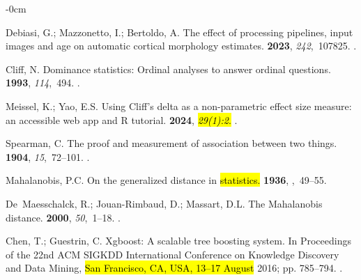 \documentclass[diagnostics,article,accept,pdftex,moreauthors]{Definitions/mdpi}
\begin{document}
\begin{adjustwidth}{-\extralength}{0cm}
\begin{thebibliography}{999}
Debiasi, G.; Mazzonetto, I.; Bertoldo, A.
\newblock The effect of processing pipelines, input images and age on automatic
  cortical morphology estimates.
 {\bf 2023}, {\em
  242},~107825.
.

Cliff, N.
\newblock Dominance statistics: Ordinal analyses to answer ordinal questions.
 {\bf 1993}, {\em 114},~494.
.

Meissel, K.; Yao, E.S.
\newblock Using Cliff’s delta as a non-parametric effect size measure: an
  accessible web app and R tutorial.
 {\bf 2024}, \hl{{\em 29(1):2}.} %
.

Spearman, C.
\newblock The proof and measurement of association between two things.
 {\bf 1904}, {\em
  15},~72--101.
.

Mahalanobis, P.C.
\newblock On the generalized distance in \hl{statistics.} %
  {\bf 1936},
,~49--55.

De~Maesschalck, R.; Jouan-Rimbaud, D.; Massart, D.L.
\newblock The {Mahalanobis} distance.
 {\bf 2000},
  {\em 50},~1--18.
.

Chen, T.; Guestrin, C.
\newblock Xgboost: A scalable tree boosting system.
\newblock In Proceedings of the {22nd ACM SIGKDD}
  International Conference on Knowledge Discovery and Data Mining, \hl{San Francisco, CA, USA, 13--17 August} 2016; pp.
  785--794.
.


\end{thebibliography}
\end{adjustwidth}
\end{document}
